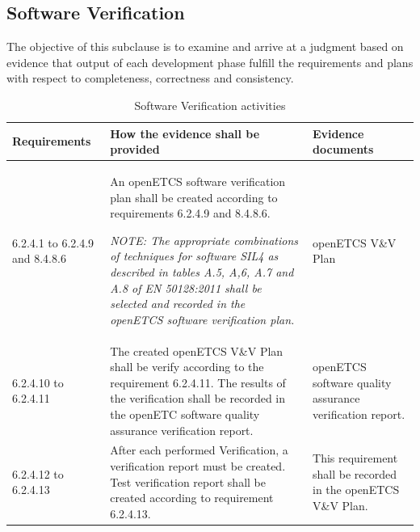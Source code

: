 \documentclass{template/openetcs_report}
\begin{document}
\subsection{Software Verification}
\begin{flushleft}
The objective of this subclause is to examine and arrive at a judgment based on evidence that output of each development phase fulfill the requirements and plans with respect to completeness, correctness and consistency.
\end{flushleft}
{\footnotesize\sffamily\centering
\begin{longtable}{|p{2cm}|p{9cm}|p{3cm}|}
\caption{Software Verification activities}\\
\hline
\bfseries Requirements & \bfseries How the evidence shall be provided & \bfseries Evidence documents\\
\hline
\hline
\endhead
\hline
\endfoot

6.2.4.1 to 6.2.4.9 and 8.4.8.6 & An openETCS software verification plan shall be created according to requirements 6.2.4.9 and 8.4.8.6.

\textit{NOTE: \linebreak The appropriate combinations of techniques for software SIL4 as described in tables A.5, A,6, A.7 and A.8 of EN 50128:2011 shall be selected and recorded in the openETCS software verification plan.}
& openETCS V\&V Plan\\ 
\hline
6.2.4.10 to 6.2.4.11 & The created openETCS V\&V Plan shall be verify according to the requirement 6.2.4.11. 
The results of the verification shall be recorded in the openETC software quality assurance verification report.
& openETCS software quality assurance verification report.\\ 
\hline
6.2.4.12 to 6.2.4.13 & After each performed Verification, a verification report must be created. 
Test verification report shall be created according to requirement 6.2.4.13.
& This requirement shall be recorded in the openETCS V\&V Plan.\\ 
\hline
\end{longtable}}
\end{document}
